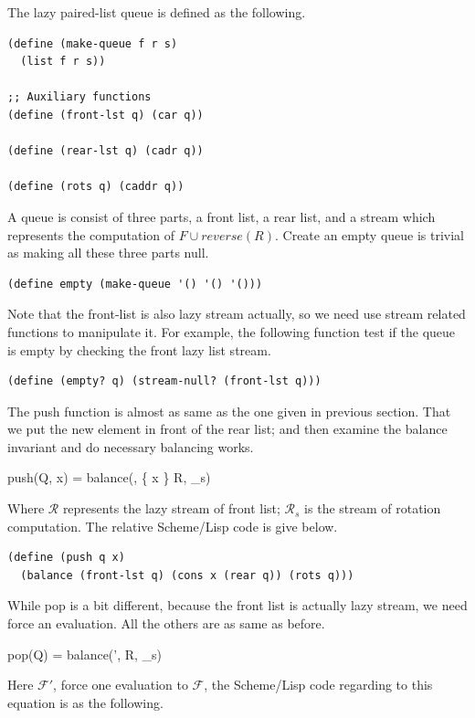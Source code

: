 \documentclass[UTF8]{article}
\begin{document}
The lazy paired-list queue is defined as the following.

\lstset{language=Lisp}
\begin{lstlisting}
(define (make-queue f r s)
  (list f r s))

;; Auxiliary functions
(define (front-lst q) (car q))

(define (rear-lst q) (cadr q))

(define (rots q) (caddr q))
\end{lstlisting}

A queue is consist of three parts, a front list, a rear list,
and a stream which represents the computation of $F \cup reverse(R)$.
Create an empty queue is trivial as making all these three parts
null.

\begin{lstlisting}
(define empty (make-queue '() '() '()))
\end{lstlisting}

Note that the front-list is also lazy stream actually, so we need use
stream related functions to manipulate it. For example, the following
function test if the queue is empty by checking the front lazy list stream.

\begin{lstlisting}
(define (empty? q) (stream-null? (front-lst q)))
\end{lstlisting}

The push function is almost as same as the one given in previous section.
That we put the new element in front of the rear list; and then examine
the balance invariant and do necessary balancing works.

\be
push(Q, x) = balance(, \{ x \} \cup R, _s)
\ee

Where $\mathcal{R}$ represents the lazy stream of front list; $\mathcal{R}_s$ is
the stream of rotation computation. The relative Scheme/Lisp
code is give below.

\begin{lstlisting}
(define (push q x)
  (balance (front-lst q) (cons x (rear q)) (rots q)))
\end{lstlisting}

While pop is a bit different, because the front list is actually lazy stream,
we need force an evaluation. All the others are as same as before.

\be
pop(Q) = balance(', R, _s)
\ee

Here $\mathcal{F}'$, force one evaluation to $\mathcal{F}$, the Scheme/Lisp
code regarding to this equation is as the following.
\end{document}
